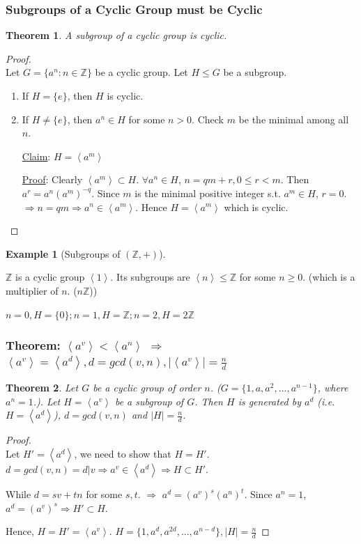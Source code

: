 \documentclass[11pt,a4paper]{article}
\newtheorem{theorem}{Theorem}
\newtheorem{example}{Example}
\begin{document}
\subsubsection{Subgroups of a Cyclic Group must be Cyclic}
\begin{theorem}
A subgroup of a cyclic group is cyclic.
\end{theorem}
\begin{proof}
\quad\\
Let $G=\{a^n:n\in \mathbb{Z}\}$ be a cyclic group. Let $H\leq G$ be a subgroup.
\begin{enumerate}
    \item If $H=\{e\}$, then $H$ is cyclic.
    \item If $H\neq \{e\}$, then $a^n\in H$ for some $n>0$. Check $m$ be the minimal among all $n$.
    
    \underline{Claim}: $H=\left\langle a^m\right\rangle$

    \underline{Proof}: Clearly $\left\langle a^m\right\rangle\subset H$. $\forall a^n\in H$, $n=qm+r,0\leq r<m$. Then $a^r=a^n(a^m)^{-q}$. Since $m$ is the minimal positive integer s.t. $a^m\in H$, $r=0$. $\Rightarrow n=qm \Rightarrow a^n\in \left\langle a^m\right\rangle$. Hence $H=\left\langle a^m\right\rangle$ which is cyclic.
\end{enumerate}
\end{proof}
\begin{example}[Subgroups of $(\mathbb{Z},+)$]
\end{example}
$\mathbb{Z}$ is a cyclic group $\left\langle 1\right\rangle$. Its subgroups are $\left\langle n\right\rangle\leq \mathbb{Z}$ for some $n\geq 0$. (which is a multiplier of $n$. ($n \mathbb{Z}$))

$n=0,H=\{0\}; n=1,H=\mathbb{Z}; n=2,H=2 \mathbb{Z}$

\subsubsection{Theorem: $\left\langle a^v\right\rangle<\left\langle a^n\right\rangle$ $\Rightarrow$ $\left\langle a^v\right\rangle=\left\langle a^d\right\rangle, d=gcd(v,n), |\left\langle a^v\right\rangle|=\frac{n}{d}$}
\begin{theorem}
    Let $G$ be a cyclic group of order $n$. ($G=\{1,a,a^2,...,a^{n-1}\}$, where $a^n=1$.). Let $H= \left\langle a^v\right\rangle$ be a subgroup of $G$. Then $H$ is generated by $a^d$ (i.e. $H=\left\langle a^d\right\rangle$), $d=gcd(v,n)$ and $|H|=\frac{n}{d}$.
\end{theorem}
\begin{proof}
\quad\\
Let $H'=\left\langle a^d\right\rangle$, we need to show that $H=H'$. $d=gcd(v,n)=d|v \Rightarrow a^v\in \left\langle a^d\right\rangle \Rightarrow H\subset H'$.

While $d=sv+tn$ for some $s,t$. $\Rightarrow$ $a^d=(a^v)^s(a^n)^t$. Since $a^n=1$, $a^d=(a^v)^s \Rightarrow	H'\subset H$.

Hence, $H=H'=\left\langle a^v\right\rangle$. $H=\{1,a^d,a^{2d},...,a^{n-d}\}, |H|=\frac{n}{d}$
\end{proof}
\end{document}
